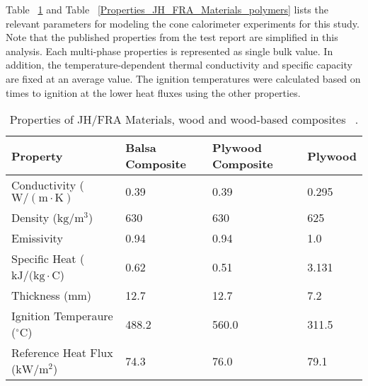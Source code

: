 Table ~\ref{Properties_JH_FRA_Materials_woods} and Table ~\ref{Properties_JH_FRA_Materials_polymers} lists the relevant parameters for modeling the cone calorimeter experiments for this study.
Note that the published properties from the test report are simplified in this analysis. Each multi-phase properties is represented as single bulk value. 
In addition, the temperature-dependent thermal conductivity and specific capacity are fixed at an average value. 
The ignition temperatures were calculated based on times to ignition at the lower heat fluxes using the other properties.

\begin{table}[!h]
\caption[Properties of JH/FRA Materials, wood and wood-based composites]{Properties of JH/FRA Materials, wood and wood-based composites ~\cite{Luo:FRA2019}.}
\centering
\begin{tabular}{|l|p{1.4cm}|p{1.4cm}|p{1.4cm}|}
\hline
Property                                    &     Balsa Composite   &  Plywood Composite  &     Plywood      \\ \hline
Conductivity    ($\mathrm{W/(m\cdot K)}$    &     0.39              &  0.39               &     0.295        \\ \hline
Density        ($\mathrm{kg/m^{3}}$)        &     630               &  630                &     625          \\ \hline
Emissivity                                  &     0.94              &  0.94               &     1.0          \\ \hline
Specific Heat  ($\mathrm{kJ/(kg\cdot C}$)   &     0.62              &  0.51               &     3.131        \\ \hline
Thickness ($\mathrm{mm}$)                   &     12.7              &  12.7               &     7.2          \\ \hline
Ignition Temperaure ($\mathrm{^{\circ}C}$)  &     488.2             &  560.0              &     311.5        \\ \hline
Reference Heat Flux ($\mathrm{kW/m^{2}}$)   &     74.3              &  76.0               &     79.1         \\ \hline
\end{tabular}
\label{Properties_JH_FRA_Materials_woods}
\end{table}

